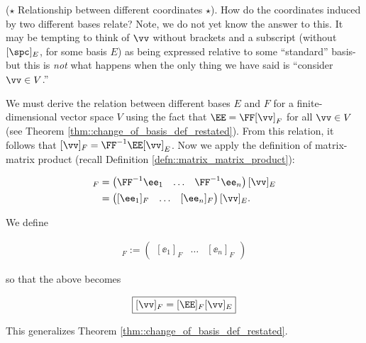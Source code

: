 \begin{theorem} 
\label{thm::change_of_basis}
    ($\star$ Relationship between different coordinates $\star$). How do the coordinates induced by two different bases relate? Note, we do not yet know the answer to this. It may be tempting to think of $\vv$ without brackets and a subscript (without $[\spc]_E$, for some basis $E$) as being expressed relative to some ``standard'' basis- but this is \textit{not} what happens when the only thing we have said is ``consider $\vv \in V$.'' 

    We must derive the relation between different bases $E$ and $F$ for a finite-dimensional vector space $V$ using the fact that $\EE = \FF [\vv]_F$ for all $\vv \in V$ (see Theorem \ref{thm::change_of_basis_def_restated}). From this relation, it follows that $[\vv]_F = \FF^{-1} \EE [\vv]_E$. Now we apply the definition of matrix-matrix product (recall Definition \ref{defn::matrix_matrix_product}):
            
    \begin{align*}
        [\vv]_F
        &=
        \begin{pmatrix}
            \FF^{-1} \ee_1 & \hdots & \FF^{-1} \ee_n
        \end{pmatrix}
        [\vv]_E
        \\
        &=
        \begin{pmatrix}
            [\ee_1]_F & \hdots & [\ee_n]_F
        \end{pmatrix}
        [\vv]_E.
    \end{align*}
            
    We define
    
    \begin{align*}
        [\EE]_F := \begin{pmatrix} [\ee_1]_F & \hdots & [\ee_n]_F \end{pmatrix}
    \end{align*}
    
    so that the above becomes
    
    \begin{align*}
        \boxed
        {
            [\vv]_F = [\EE]_F [\vv]_E
        }
    \end{align*}
    
    This generalizes Theorem \ref{thm::change_of_basis_def_restated}.
\end{theorem}

